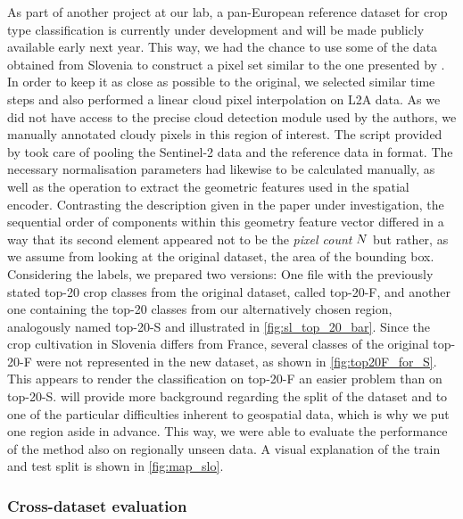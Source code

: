 \figMapSlo
As part of another project at our lab, a pan-European reference dataset for crop type classification is currently under development and will be made publicly available early next year.
This way, we had the chance to use some of the data obtained from Slovenia to construct a {pixel set} similar to the one presented by \textcite{Garnot20:SIT}.
In order to keep it as close as possible to the original, we selected similar time steps and also performed a linear cloud pixel interpolation on L2A \sentinel data.
As we did not have access to the precise cloud detection module used by the authors, we manually annotated cloudy pixels in this region of interest.
The  script provided by \citeauthor{Garnot20:SIT} took care of pooling the Sentinel-2 data and the reference data in \geojson format.
The necessary normalisation parameters had likewise to be calculated manually, as well as the operation to extract the geometric features used in the {spatial encoder}.
Contrasting the description given in the paper under investigation, the sequential order of components within this geometry feature vector differed in a way that its second element appeared not to be the \emph{pixel count} $N$ but rather, as we assume from looking at the original dataset, the area of the bounding box.
Considering the labels, we prepared two versions: 
One file with the previously stated top-20 crop classes from the original dataset, called top-20-F, and another one containing the top-20 classes from our alternatively chosen region, analogously named top-20-S and illustrated in \cref{fig:sl_top_20_bar}.
Since the crop cultivation in Slovenia differs from France, several classes of the original top-20-F were not represented in the new dataset, as shown in \cref{fig:top20F_for_S}.
This appears to render the classification on top-20-F an easier problem than on top-20-S.
 will provide more background regarding the split of the dataset and to one of the particular difficulties inherent to geospatial data, which is why we put one region aside in advance.
This way, we were able to evaluate the performance of the method also on regionally unseen data.
A visual explanation of the train and test split is shown in \cref{fig:map_slo}.


\subsubsection{Cross-dataset evaluation} \label{sec:crossdataset}

